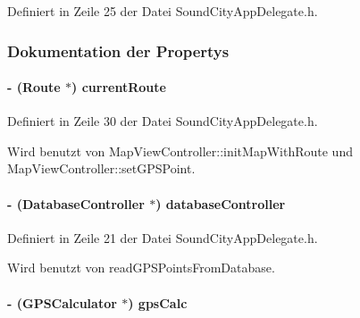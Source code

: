 Definiert in Zeile 25 der Datei SoundCityAppDelegate.h.

\subsubsection{Dokumentation der Propertys}
\hypertarget{interface_sound_city_app_delegate_a10dee28d622e01c6acae7df512172b72}{
\paragraph[{currentRoute}]{\setlength{\rightskip}{0pt plus 5cm}-\/ ({\bf Route} $\ast$) currentRoute}\hfill}
\label{interface_sound_city_app_delegate_a10dee28d622e01c6acae7df512172b72}


Definiert in Zeile 30 der Datei SoundCityAppDelegate.h.

Wird benutzt von MapViewController::initMapWithRoute und MapViewController::setGPSPoint.\hypertarget{interface_sound_city_app_delegate_a692eabf939d719d6fa61205327df9a67}{
\paragraph[{databaseController}]{\setlength{\rightskip}{0pt plus 5cm}-\/ ({\bf DatabaseController} $\ast$) databaseController}\hfill}
\label{interface_sound_city_app_delegate_a692eabf939d719d6fa61205327df9a67}


Definiert in Zeile 21 der Datei SoundCityAppDelegate.h.

Wird benutzt von readGPSPointsFromDatabase.\hypertarget{interface_sound_city_app_delegate_a5a2710c1bcf8b87d74b67d4f536fbf1b}{
\paragraph[{gpsCalc}]{\setlength{\rightskip}{0pt plus 5cm}-\/ ({\bf GPSCalculator} $\ast$) gpsCalc}\hfill}
\label{interface_sound_city_app_delegate_a5a2710c1bcf8b87d74b67d4f536fbf1b}


